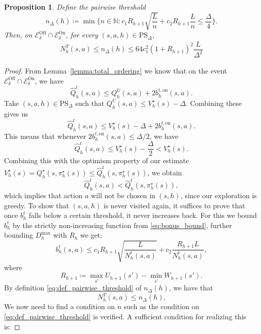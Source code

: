 \documentclass[twoside]{article}
\newtheorem{proposition}{Proposition}
\newcommand{\on}{\mathrm{on}} %
\newcommand{\bont}{b_h^{t,\on}} %
\newcommand{\PS}{\mathrm{PS}_{\Delta}} %
\newcommand{\lowv}{W} %
\newcommand{\highv}{U} %
\begin{document}
\begin{proposition}
\label{prop:max_vis}
Define the pairwise threshold
%
\begin{equation}\label{eq:def_pairwise_threshold}
n_\Delta(h) \coloneqq \min \bigg\{n\in\mathbb{N}: c_1R_{h+1}\sqrt{\frac{L}{n}}+c_2 R_{h+1}\frac{L}{n} \le \frac{\Delta}{4} \bigg\}.
\end{equation}
Then, on $\mathcal{E}^{\mathrm{Off}}_\delta\cap \mathcal{E}^{\mathrm{On}}_\delta$, for every $(s,a,h)\in\PS$,
\begin{align}
    N_h^T(s,a) \le n_\Delta(h) \le 64 c_1^2 (1+R_{h+1})^2 \dfrac{L}{\Delta^2} 
    \label{eq:total_visitation_pseudosub}
\end{align}
\end{proposition}
\begin{proof}
From Lemma~\ref{lemma:total_ordering} we know that on the event $\mathcal{E}^{\mathrm{Off}}_\delta\cap \mathcal{E}^{\mathrm{On}}_\delta$, we have 
\[
\widehat{Q}_h^t(s,a) \le Q_h^{\highv}(s,a)+2 \bont(s,a).
\]
Take $(s,a,h)\in\PS$ such that  $Q_h^\highv(s,a) \le V_h^\star(s) - \Delta$. Combining these gives us 
\[
\widehat{Q}_h^t(s,a) \le V_h^\star(s) - \Delta + 2 \bont(s,a).
\]
This means that whenever $2\bont(s,a) \le \Delta/2$, we have 
\[
    \widehat{Q}_h^t(s,a) \le V_h^\star(s) - \dfrac{\Delta}{2} < V_h^\star(s). 
\]
Combining this with the optimism property of our estimate $V_h^\star(s) = Q_h^\star(s, \pi_h^\star(s)) \le \widehat{Q}_h^t(s,\pi_h^\star(s))$, we obtain 
\[
    \widehat{Q}_h^t(s,a) < \widehat{Q}_h^t(s,\pi_h^\star(s)),
\]
which implies that action $a$ will not be chosen in $(s,h)$, since our exploration is greedy. To show that $(s,a,h)$ is never visited again, it suffices to prove that once $b_h^t$ falls below a certain threshold, it never increases back. For this we bound $b_h^t$ by the strictly non-increasing function from \eqref{eq:bonus_bound}, further bounding $D^{\max}_h$ with $R_h$ we get: 
\[
b_h^{t}(s,a) \le 
c_1R_{h+1} \sqrt{\frac{L}{N_h^t(s,a)}}
 + 
c_2\frac{R_{h+1}L}{N_h^t(s,a)},
\]
where
\[
R_{h+1}\coloneqq\max_{s'}\highv_{h+1}(s')-\min_{s'}\lowv_{h+1}(s').
\]
By definition \eqref{eq:def_pairwise_threshold} of $n_\Delta(h)$, we have that 
\[ 
 N_h^T(s,a) \le n_\Delta(h).
\]
We now need to find a condition on $n$ such as the condition on \eqref{eq:def_pairwise_threshold} is verified. A sufficient condition for realizing this is:


\end{proof}
\end{document}
